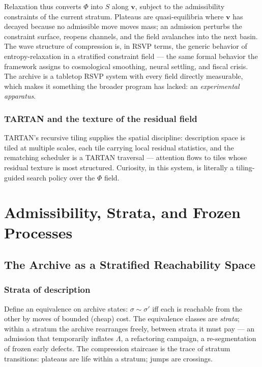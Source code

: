 \documentclass[11pt,oneside]{book}
\theoremstyle{remark}
\newcommand{\Phiv}{\Phi}
\newcommand{\vv}{\mathbf{v}}
\newcommand{\Sv}{S}
\begin{document}
Relaxation thus converts $\Phiv$ into $\Sv$ along $\vv$, subject to the
admissibility constraints of the current stratum. Plateaus are
quasi-equilibria where $\vv$ has decayed because no admissible move
moves mass; an admission perturbs the constraint surface, reopens
channels, and the field avalanches into the next basin. The wave
structure of compression is, in RSVP terms, the generic behavior of
entropy-relaxation in a stratified constraint field --- the same
formal behavior the framework assigns to cosmological smoothing,
neural settling, and fiscal crisis. The archive is a tabletop RSVP
system with every field directly measurable, which makes it something
the broader program has lacked: an \emph{experimental apparatus}.

\section{TARTAN and the texture of the residual field}

TARTAN's recursive tiling supplies the spatial discipline: description
space is tiled at multiple scales, each tile carrying local residual
statistics, and the rematching scheduler is a TARTAN traversal ---
attention flows to tiles whose residual texture is most structured.
Curiosity, in this system, is literally a tiling-guided search policy
over the $\Phiv$ field.

\part{Admissibility, Strata, and Frozen Processes}

\chapter{The Archive as a Stratified Reachability Space}

\section{Strata of description}

Define an equivalence on archive states: $\sigma \sim \sigma'$ iff each
is reachable from the other by moves of bounded (cheap) cost. The
equivalence classes are \emph{strata}; within a stratum the archive
rearranges freely, between strata it must pay --- an admission that
temporarily inflates $\Lambda$, a refactoring campaign, a re-segmentation
of frozen early defects. The compression staircase is the trace of
stratum transitions: plateaus are life within a stratum; jumps are
crossings.
\end{document}
